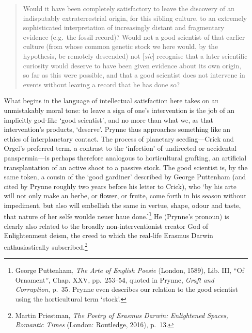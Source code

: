 \documentclass[]{article}
\begin{document}
\begin{quote}
Would it have been completely satisfactory to leave the discovery of an
indisputably extraterrestrial origin, for this sibling culture, to an
extremely sophisticated interpretation of increasingly distant and
fragmentary evidence (e.g.~the fossil record)? Would not a good
scientist of that earlier culture (from whose common genetic stock we
here would, by the hypothesis, be remotely descended) not
{[}\emph{sic}{]} recognise that a later scientific curiosity would
deserve to have been given evidence about its own origin, so far as this
were possible, and that a good scientist does not intervene in events
without leaving a record that he has done so?
\end{quote}

\noindent What begins in the language of intellectual satisfaction here
takes on an unmistakably moral tone: to leave a sign of one's
intervention is the job of an implicitly god-like `good scientist', and
no more than what we, as that intervention's products, `deserve'. Prynne
thus approaches something like an ethics of interplanetary contact. The
process of planetary seeding---Crick and Orgel's preferred term, a
contrast to the `infection' of undirected or accidental panspermia---is
perhaps therefore analogous to horticultural grafting, an artificial
transplantation of an active shoot to a passive stock. The good
scientist is, by the same token, a cousin of the `good gardiner'
described by George Puttenham (and cited by Prynne roughly two years
before his letter to Crick), who `by his arte will not only make an
herbe, or flower, or fruite, come forth in his season without
impediment, but also will embellish the same in vertue, shape, odour and
taste, that nature of her selfe woulde neuer haue done.'\footnote{George
  Puttenham, \emph{The Arte of English Poesie} (London, 1589), Lib. III,
  ``Of Ornament'', Chap. XXV, pp.~253--54, quoted in Prynne, \emph{Graft
  and Corruption}, p.~35. Prynne even describes our relation to the good
  scientist using the horticultural term `stock'.} He (Prynne's pronoun)
is clearly also related to the broadly non-interventionist creator God
of Enlightenment deism, the creed to which the real-life Erasmus Darwin
enthusiastically subscribed.\footnote{Martin Priestman, \emph{The Poetry
  of Erasmus Darwin: Enlightened Spaces, Romantic Times} (London:
  Routledge, 2016), p.~13.}
\end{document}
